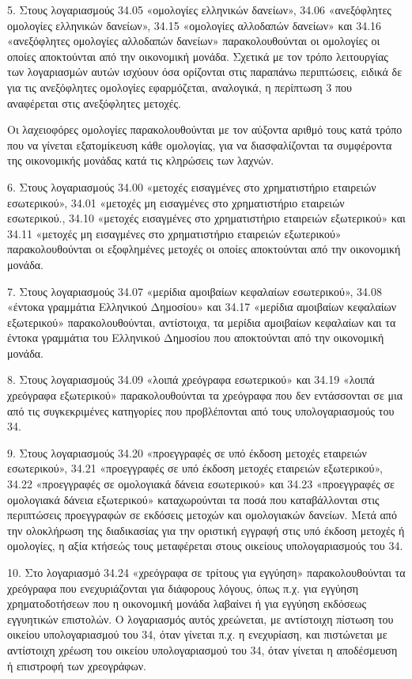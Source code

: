 \documentclass[A4,10pt,greek]{book}
\begin{document}
5. Στους λογαριασμούς 34.05 «ομολογίες ελληνικών δανείων», 34.06 «ανεξόφλητες ομολογίες ελληνικών δανείων», 34.15 «ομολογίες αλλοδαπών δανείων» και 34.16 «ανεξόφλητες ομολογίες αλλοδαπών δανείων» παρακολουθούνται οι ομολογίες οι οποίες αποκτούνται από την οικονομική μονάδα. Σχετικά με τον τρόπο λειτουργίας των λογαριασμών αυτών ισχύουν όσα ορίζονται στις παραπάνω περιπτώσεις, ειδικά δε για τις ανεξόφλητες ομολογίες εφαρμόζεται, αναλογικά, η περίπτωση 3 που αναφέρεται στις ανεξόφλητες μετοχές.

Οι λαχειοφόρες ομολογίες παρακολουθούνται με τον αύξοντα αριθμό τους κατά τρόπο που να γίνεται εξατομίκευση κάθε ομολογίας, για να διασφαλίζονται τα συμφέροντα της οικονομικής μονάδας κατά τις κληρώσεις των λαχνών.

6. Στους λογαριασμούς 34.00 «μετοχές εισαγμένες στο χρηματιστήριο εταιρειών εσωτερικού», 34.01 «μετοχές μη εισαγμένες στο χρηματιστήριο εταιρειών εσωτερικού., 34.10 «μετοχές εισαγμένες στο χρηματιστήριο εταιρειών εξωτερικού» και 34.11 «μετοχές μη εισαγμένες στο χρηματιστήριο εταιρειών εξωτερικού» παρακολουθούνται οι εξοφλημένες μετοχές οι οποίες αποκτούνται από την οικονομική μονάδα.

7. Στους λογαριασμούς 34.07 «μερίδια αμοιβαίων κεφαλαίων εσωτερικού», 34.08 «έντοκα γραμμάτια Ελληνικού Δημοσίου» και 34.17 «μερίδια αμοιβαίων κεφαλαίων εξωτερικού» παρακολουθούνται, αντίστοιχα, τα μερίδια αμοιβαίων κεφαλαίων και τα έντοκα γραμμάτια του Ελληνικού Δημοσίου που αποκτούνται από την οικονομική μονάδα.

8. Στους λογαριασμούς 34.09 «λοιπά χρεόγραφα εσωτερικού» και 34.19 «λοιπά χρεόγραφα εξωτερικού» παρακολουθούνται τα χρεόγραφα που δεν εντάσσονται σε μια από τις συγκεκριμένες κατηγορίες που προβλέπονται από τους υπολογαριασμούς του 34.

9. Στους λογαριασμούς 34.20 «προεγγραφές σε υπό έκδοση μετοχές εταιρειών εσωτερικού», 34.21 «προεγγραφές σε υπό έκδοση μετοχές εταιρειών εξωτερικού», 34.22 «προεγγραφές σε ομολογιακά δάνεια εσωτερικού» και 34.23 «προεγγραφές σε ομολογιακά δάνεια εξωτερικού» καταχωρούνται τα ποσά που καταβάλλονται στις περιπτώσεις προεγγραφών σε εκδόσεις μετοχών και ομολογιακών δανείων. Μετά από την ολοκλήρωση της διαδικασίας για την οριστική εγγραφή στις υπό έκδοση μετοχές ή ομολογίες, η αξία κτήσεώς τους μεταφέρεται στους οικείους υπολογαριασμούς του 34.

10. Στο λογαριασμό 34.24 «χρεόγραφα σε τρίτους για εγγύηση» παρακολουθούνται τα χρεόγραφα που ενεχυριάζονται για διάφορους λόγους, όπως π.χ. για εγγύηση χρηματοδοτήσεων που η οικονομική μονάδα λαβαίνει ή για εγγύηση εκδόσεως εγγυητικών επιστολών. Ο λογαριασμός αυτός χρεώνεται, με αντίστοιχη πίστωση του οικείου υπολογαριασμού του 34, όταν γίνεται π.χ. η ενεχυρίαση, και πιστώνεται με αντίστοιχη χρέωση του οικείου υπολογαριασμού του 34, όταν γίνεται η αποδέσμευση ή επιστροφή των χρεογράφων.
\end{document}
